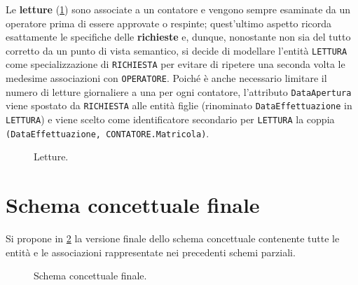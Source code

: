 \documentclass[a4paper,12pt]{report}
\begin{document}
Le \textbf{letture} (\cref{fig:measurements}) sono associate a un contatore e vengono sempre esaminate da un operatore prima di essere approvate o respinte; quest'ultimo aspetto ricorda esattamente le specifiche delle \textbf{richieste} e, dunque, nonostante non sia del tutto corretto da un punto di vista semantico, si decide di modellare l'entità \texttt{LETTURA} come specializzazione di \texttt{RICHIESTA} per evitare di ripetere una seconda volta le medesime associazioni con \texttt{OPERATORE}. Poiché è anche necessario limitare il numero di letture giornaliere a una per ogni contatore, l'attributo \texttt{DataApertura} viene spostato da \texttt{RICHIESTA} alle entità figlie (rinominato \texttt{DataEffettuazione} in \texttt{LETTURA}) e viene scelto come identificatore secondario per \texttt{LETTURA} la coppia \texttt{(DataEffettuazione, CONTATORE.Matricola)}.

\begin{figure}[H]
\centering{}
\caption{Letture.}
\label{fig:measurements}
\end{figure}

\section{Schema concettuale finale}
Si propone in \cref{fig:full-schema} la versione finale dello schema concettuale contenente tutte le entità e le associazioni rappresentate nei precedenti schemi parziali.

\begin{figure}
\centering{}
\caption{Schema concettuale finale.}
\label{fig:full-schema}
\end{figure}
\end{document}
